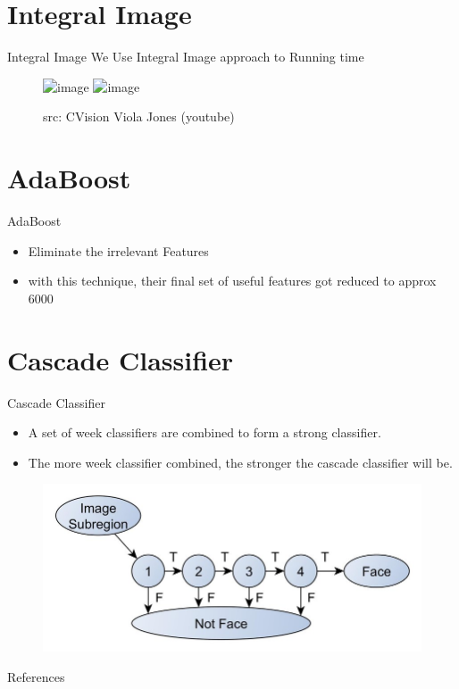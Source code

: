 \documentclass[aspectratio=169]{beamer}
\begin{document}
\section{Integral Image}
\begin{frame}{Integral Image}
    We Use Integral Image approach to Running time \\ \vspace{0.5cm}
    \begin{figure}
        \centering
        \includegraphics<1>[width=0.8\linewidth]{assets/figures/integral-image01.png}
        \includegraphics<2>[width=0.8\linewidth]{assets/figures/integral-image02.png}
        \caption{src: CVision Viola Jones (youtube) \cite{CVisionViolaJones}}
    \end{figure}
\end{frame}
\section{AdaBoost}
\begin{frame}{AdaBoost}
    \begin{itemize}
        \item Eliminate the irrelevant Features
        \item with this technique, their final set of useful features got reduced to approx 6000
    \end{itemize}
\end{frame}
\section{Cascade Classifier}
\begin{frame}{Cascade Classifier}
    \begin{itemize}
        \item A set of week classifiers are combined to form a strong classifier.
        \item The more week classifier combined, the stronger the cascade classifier will be.
    \end{itemize}
    \begin{figure}
        \includegraphics[width=0.7\linewidth]{assets/figures/cascade-classifier.png}
    \end{figure}
\end{frame}

\begin{frame}{References}
    
    
\end{frame}
\end{document}
